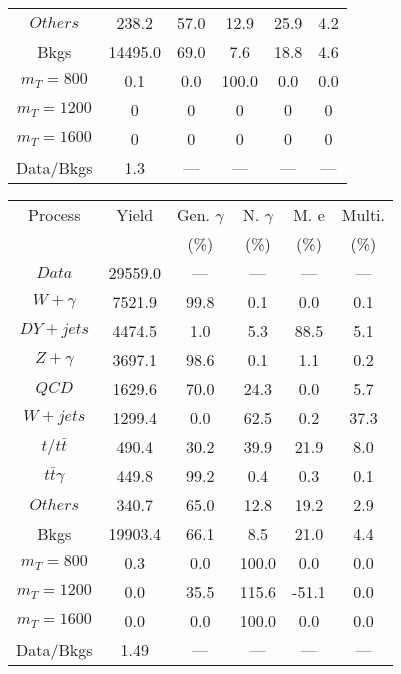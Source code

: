 \begin{figure}
\begin{minipage}[c]{0.32\textwidth}
{\begin{tabular}{cccccc}
$ Others $ &  238.2 &  57.0 &  12.9 &  25.9 &  4.2\\
Bkgs &  14495.0 &  69.0 &  7.6 &  18.8 &  4.6\\
$ m_{T} = 800 $ &  0.1 &  0.0 &  100.0 &  0.0 &  0.0\\
$ m_{T} = 1200 $ &  0 &  0 &  0 &  0 &  0\\
$ m_{T} = 1600 $ &  0 &  0 &  0 &  0 &  0\\
Data/Bkgs &  1.3 &  --- &  --- &  --- &  ---\\
\hline
\end{tabular}
}
\end{minipage}
\begin{minipage}[c]{0.32\textwidth}
\centering
\tiny{
\begin{tabular}{cccccc}
\hline
Process & Yield & Gen. $\gamma$ & N. $\gamma$ & M. e & Multi. \\
 &  & (\%) & (\%) & (\%) & (\%)  \\
\hline
                                                                      $ Data $ &  29559.0 &  --- &  --- &  --- &  ---\\
$ W+\gamma $ &  7521.9 &  99.8 &  0.1 &  0.0 &  0.1\\
$ DY+jets $ &  4474.5 &  1.0 &  5.3 &  88.5 &  5.1\\
$ Z+\gamma $ &  3697.1 &  98.6 &  0.1 &  1.1 &  0.2\\
$ QCD $ &  1629.6 &  70.0 &  24.3 &  0.0 &  5.7\\
$ W+jets $ &  1299.4 &  0.0 &  62.5 &  0.2 &  37.3\\
$ t/t\bar{t} $ &  490.4 &  30.2 &  39.9 &  21.9 &  8.0\\
$ t\bar{t}\gamma $ &  449.8 &  99.2 &  0.4 &  0.3 &  0.1\\
$ Others $ &  340.7 &  65.0 &  12.8 &  19.2 &  2.9\\
Bkgs &  19903.4 &  66.1 &  8.5 &  21.0 &  4.4\\
$ m_{T} = 800 $ &  0.3 &  0.0 &  100.0 &  0.0 &  0.0\\
$ m_{T} = 1200 $ &  0.0 &  35.5 &  115.6 &  -51.1 &  0.0\\
$ m_{T} = 1600 $ &  0.0 &  0.0 &  100.0 &  0.0 &  0.0\\
Data/Bkgs &  1.49 &  --- &  --- &  --- &  ---\\
\hline
\end{tabular}
}
\end{minipage}
\begin{minipage}[c]{0.32\textwidth}
\centering
\tiny{
\begin{tabular}{cccccc}

\end{tabular}}
\end{minipage}
\end{figure}
